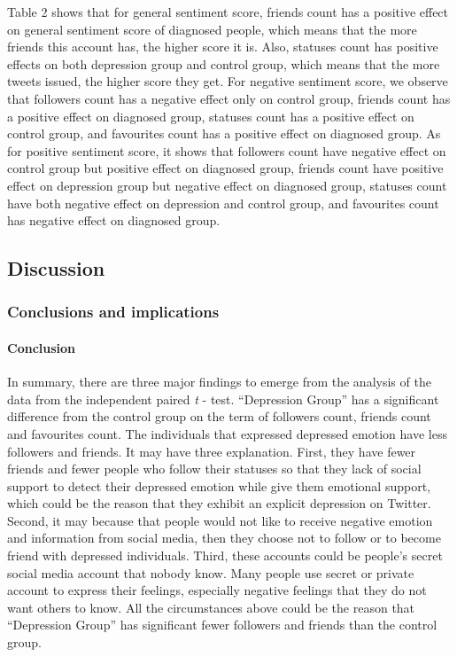 \documentclass[]{article}
\let\oldparagraph\paragraph
\renewcommand{\paragraph}[1]{\oldparagraph{#1}\mbox{}}
\begin{document}
Table 2 shows that for general sentiment score, friends count has a
positive effect on general sentiment score of diagnosed people, which
means that the more friends this account has, the higher score it is.
Also, statuses count has positive effects on both depression group and
control group, which means that the more tweets issued, the higher score
they get. For negative sentiment score, we observe that followers count
has a negative effect only on control group, friends count has a
positive effect on diagnosed group, statuses count has a positive effect
on control group, and favourites count has a positive effect on
diagnosed group. As for positive sentiment score, it shows that
followers count have negative effect on control group but positive
effect on diagnosed group, friends count have positive effect on
depression group but negative effect on diagnosed group, statuses count
have both negative effect on depression and control group, and
favourites count has negative effect on diagnosed group.

\hypertarget{discussion}{%
\subsection{Discussion}\label{discussion}}

\hypertarget{conclusions-and-implications}{%
\subsubsection{Conclusions and
implications}\label{conclusions-and-implications}}

\hypertarget{conclusion}{%
\paragraph{Conclusion}\label{conclusion}}

In summary, there are three major findings to emerge from the analysis
of the data from the independent paired \emph{t} - test. ``Depression
Group'' has a significant difference from the control group on the term
of followers count, friends count and favourites count. The individuals
that expressed depressed emotion have less followers and friends. It may
have three explanation. First, they have fewer friends and fewer people
who follow their statuses so that they lack of social support to detect
their depressed emotion while give them emotional support, which could
be the reason that they exhibit an explicit depression on Twitter.
Second, it may because that people would not like to receive negative
emotion and information from social media, then they choose not to
follow or to become friend with depressed individuals. Third, these
accounts could be people's secret social media account that nobody know.
Many people use secret or private account to express their feelings,
especially negative feelings that they do not want others to know. All
the circumstances above could be the reason that ``Depression Group''
has significant fewer followers and friends than the control group.
\end{document}
